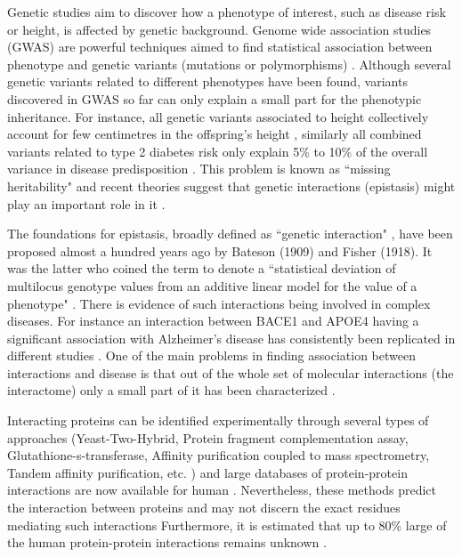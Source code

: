 Genetic studies aim to discover how a phenotype of interest, such as disease risk or height, is affected by genetic background. Genome wide association studies (GWAS) are powerful techniques aimed to find statistical association between phenotype and genetic variants (mutations or polymorphisms) \cite{clarke2011basic}. Although several genetic variants related to different phenotypes have been found, variants discovered in GWAS so far can only explain a small part for the phenotypic inheritance. For instance, all genetic variants associated to height collectively account for few centimetres in the offspring's height \cite{wood2014defining}, similarly all combined variants related to type 2 diabetes risk only explain 5\% to 10\% of the overall variance in disease predisposition \cite{morris2012large, consortium2014genome}. This problem is known as “missing heritability" \cite{manolio2009finding} and recent theories suggest that genetic interactions (epistasis) might play an important role in it \cite{zuk2012mystery, zuk2014searching}.

The foundations for epistasis, broadly defined as “genetic interaction" \cite{gao2010classification},  have been proposed almost a hundred years ago by Bateson (1909) and Fisher (1918). It was the latter who coined the term to denote a “statistical deviation of multilocus genotype values from an additive linear model for the value of a phenotype" \cite{gao2010classification}. There is evidence of such interactions being involved in complex diseases. For instance an interaction between BACE1 and APOE4 having a significant association with Alzheimer's disease has consistently been replicated in different studies \cite{combarros2009epistasis}. One of the main problems in finding association between interactions and disease is that out of the whole set of molecular interactions (the interactome) only a small part of it has been characterized \cite{venkatesan2009empirical}.

Interacting proteins can be identified experimentally through several types of approaches (Yeast-Two-Hybrid, Protein fragment complementation assay, Glutathione-s-transferase, Affinity purification coupled to mass spectrometry, Tandem affinity purification, etc. \cite{shoemaker2007deciphering}) and large databases of protein-protein interactions are now available for human \cite{stark2006biogrid, shoemaker2007deciphering}. Nevertheless, these methods predict the interaction between proteins and may not discern the exact residues mediating such interactions Furthermore, it is estimated that up to 80\% large of the human protein-protein interactions remains unknown \cite{venkatesan2009empirical}.

